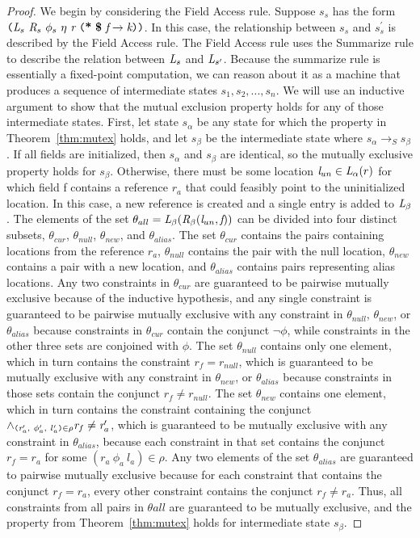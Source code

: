 \begin{proof}
We begin by considering the Field Access rule. Suppose $s_s$ has the form $\lp \cfgnt{L}_s\ \cfgnt{R}_{s}\ \phi_s\ \eta\ \cfgnt{r}\ \lp \cfgt{*}\ \cfgt{\$}\ \cfgnt{f} \rightarrow \cfgnt{k}\rp \rp$. In this case, the relationship between $s_s$ and $s_s^\prime$ is described by the Field Access rule. The Field Access rule uses the Summarize rule to describe the relation between $\emph{L}_{s}$ and $\emph{L}_{s^\prime}$. Because the summarize rule is essentially a fixed-point computation, we can reason about it as a machine that produces a sequence of intermediate states $s_1, s_2, ... , s_n$. We will use an inductive argument to show that the mutual exclusion property holds for any of those intermediate states. First, let state $s_\alpha$ be any state for which the property in Theorem~\ref{thm:mutex} holds, and let $s_\beta$ be the intermediate state where $s_\alpha \rightarrow_S s_\beta$. If all fields are initialized, then $s_\alpha$ and $s_\beta$ are identical, so the mutually exclusive property holds for $s_\beta$. 
Otherwise, there must be some location $\emph{l}_{un} \in \emph{L}_\alpha(r)$ for which field f contains a reference $r_a$ that could feasibly point to the uninitialized location. In this case, a new reference is created and a single entry is added to $\emph{L}_\beta$. The elements of the set $\theta_{all} = \emph{L}_\beta(\emph{R}_\beta(\emph{l}_{un},\emph{f}))$ can be divided into four distinct subsets, $\theta_{cur}$, $\theta_{null}$, $\theta_{new}$, and $\theta_{alias}$. The set $\theta_{cur}$ contains the pairs containing locations from the reference $r_a$, $\theta_{null}$ contains the pair with the null location, $\theta_{new}$ contains a pair with a new location, and $\theta_{alias}$ contains pairs representing alias locations. Any two constraints in $\theta_{cur}$ are guaranteed to be pairwise mutually exclusive because of the inductive hypothesis, and any single constraint is guaranteed to be pairwise mutually exclusive with any constraint in $\theta_{null}$, $\theta_{new}$, or $\theta_{alias}$ because constraints in $\theta_{cur}$ contain the conjunct $\neg \phi$, while constraints in the other three sets are conjoined with $\phi$. The set $\theta_{null}$ contains only one element, which in turn contains the constraint $r_f = r_{null}$, which is guaranteed to be mutually exclusive with any constraint in $\theta_{new}$, or $\theta_{alias}$ because constraints in those sets contain the conjunct $r_f \neq r_{null}$. The set $\theta_{new}$ contains one element, which in turn contains the constraint containing the conjunct $ \wedge_{\lp \cfgnt{r}^\prime_a,\ \phi^\prime_a,\ l^\prime_a\rp  \in \rho} \cfgnt{r}_f \ne \cfgnt{r}^\prime_a$, which is guaranteed to be mutually exclusive with any constraint in $\theta_{alias}$, because each constraint in that set contains the conjunct $r_f = r_a$ for some $(r_a\ \phi_a\ l_a)\in \rho$. Any two elements of the set $\theta_{alias}$ are guaranteed to pairwise mutually exclusive because for each constraint that contains the conjunct $r_f = r_a$, every other constraint contains the conjunct $r_f \ne r_a$. Thus, all constraints from all pairs in $\theta{all}$ are guaranteed to be mutually exclusive, and the property from Theorem~\ref{thm:mutex} holds for intermediate state $s_\beta$. 


\end{proof}
